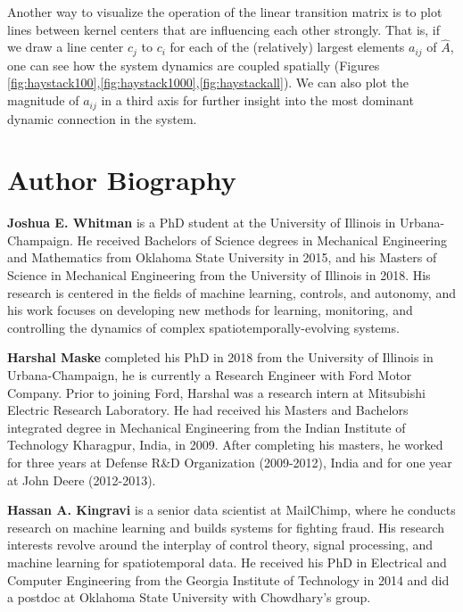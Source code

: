 \documentclass[letterpaper,12pt,peerreviewca,draftcls]{IEEEtran}
\newcommand{\dualop}{A}
\newcommand{\dualopApprox}{\widehat{\dualop}}
\begin{document}
Another way to visualize the operation of the linear transition matrix is to plot lines between kernel centers that are influencing each other strongly. That is, if we draw a line center $c_j$ to $c_i$ for each of the (relatively) largest elements $a_{ij}$ of $\dualopApprox$, one can see how the system dynamics are coupled spatially (Figures \ref{fig:haystack100},\ref{fig:haystack1000},\ref{fig:haystackall}). We can also plot the magnitude of $a_{ij}$ in a third axis for further insight into the most dominant dynamic connection in the system.


\processdelayedfloats






\newpage
\section{Author Biography}

\noindent \textbf{Joshua E. Whitman} is a PhD student at the University of Illinois in Urbana-Champaign. He received Bachelors of Science degrees in Mechanical Engineering and Mathematics from Oklahoma State University in 2015, and his Masters of Science in Mechanical Engineering from the University of Illinois in 2018. His research is centered in the fields of machine learning, controls, and autonomy, and his work focuses on developing new methods for learning, monitoring, and controlling the dynamics of complex spatiotemporally-evolving systems.

\noindent \textbf{Harshal Maske} completed his PhD in 2018 from the University of Illinois in Urbana-Champaign, he is currently a Research Engineer with Ford Motor Company. Prior to joining Ford, Harshal was a research intern at Mitsubishi Electric Research Laboratory. He had received his Masters and Bachelors integrated degree in Mechanical Engineering from the Indian Institute of Technology Kharagpur, India, in 2009. After completing his masters, he worked for three years at Defense R\&D Organization (2009-2012), India and for one year at John Deere (2012-2013). 

\noindent \textbf{Hassan A. Kingravi}  is a senior data scientist at MailChimp, where he conducts research on machine learning and builds systems for fighting fraud. His research interests revolve around the interplay of control theory, signal processing, and machine learning for spatiotemporal data. He received his PhD in Electrical and Computer Engineering from the Georgia Institute of Technology in 2014 and did a postdoc at Oklahoma State University with Chowdhary's group.
\end{document}
